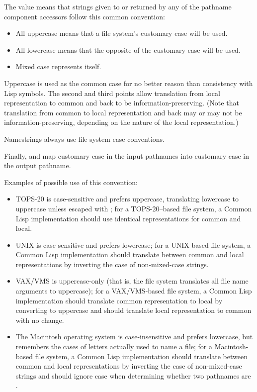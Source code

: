   The value  means that strings given to 
  or returned by any of the pathname component accessors
  follow this common convention:
\begin{itemize}
\item All uppercase means that a file system's customary case will be used.
\item All lowercase means that the opposite of the customary case will be used.
\item Mixed case represents itself.
\end{itemize}
  Uppercase is used as the common case for no better reason than
  consistency with Lisp symbols.
  The second and third points allow translation from local representation to
  common and back to be information-preserving.  (Note that translation
  from common to local representation and back may or may not be information-preserving,
  depending on the nature of the local representation.)

  Namestrings always use  file system case conventions.

  Finally,  and  map customary case in the
  input pathnames into customary case in the output pathname.

  Examples of possible use of this convention:
\begin{itemize}
  \item TOPS-20 is case-sensitive and prefers uppercase,
  translating lowercase to uppercase unless escaped with ;
  for a TOPS-20--based
  file system, a Common Lisp implementation
  should use identical
  representations for common and local.

\item UNIX is case-sensitive and prefers lowercase; for a UNIX-based file system,
  a Common Lisp implementation should translate between
  common and local representations by inverting the case of non-mixed-case strings.

\item VAX/VMS is uppercase-only (that is, the file system translates all file
  name arguments to uppercase); for a VAX/VMS-based file system,
  a Common Lisp implementation should
  translate common representation to local by
  converting to uppercase and should translate local representation
  to common with no change.

\item The Macintosh operating system is case-insensitive and prefers lowercase,
  but remembers the cases of letters actually used to name a file;
  for a Macintosh-based file system, a Common Lisp implementation should translate
  between common and local representations by inverting the case of non-mixed-case strings
  and should ignore case when determining whether two pathnames are .
\end{itemize}

